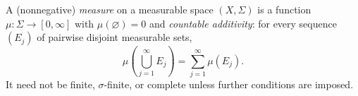 
A (nonnegative) \emph{measure} on a measurable space $(X,\Sigma)$ is a function $\mu:\Sigma\to[0,\infty]$ with $\mu(\varnothing)=0$ and \emph{countable additivity}: for every sequence $(E_j)$ of pairwise disjoint measurable sets,
\[
\mu\left(\bigcup_{j=1}^\infty E_j\right)=\sum_{j=1}^\infty\mu(E_j).
\]
It need not be finite, $\sigma$-finite, or complete unless further conditions are imposed.
